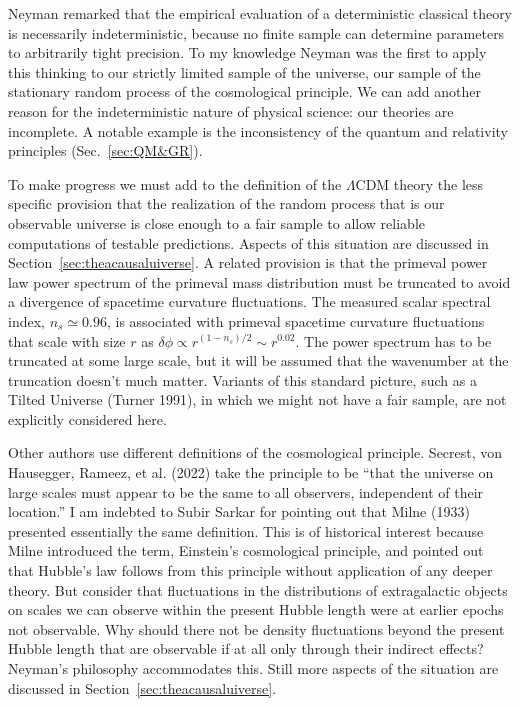 \documentclass[fleqn,12pt]{article}
\begin{document}
Neyman remarked that the empirical evaluation of a deterministic classical theory is necessarily indeterministic, because no finite sample can determine parameters to arbitrarily tight precision. To my knowledge Neyman was the first to apply this thinking to our strictly limited sample of the universe, our sample of the stationary random process of the cosmological principle. We can add another reason for the  indeterministic nature of physical science: our theories are incomplete. A notable example is the inconsistency of the quantum and relativity principles (Sec.~\ref{sec:QM&GR}).

To make progress we must add to the definition of the $\Lambda$CDM theory the less specific provision that the realization of the random process that is our observable universe is close enough to a fair sample to allow reliable computations of testable predictions. Aspects of this situation are discussed in Section~\ref{sec:theacausaluiverse}. A related provision is that the primeval power law power spectrum of the primeval mass distribution must be truncated to avoid a divergence of spacetime curvature fluctuations. The measured scalar spectral index, $n_s\simeq 0.96$, is associated with primeval spacetime curvature fluctuations that scale with size $r$ as $\delta\phi\propto r^{(1-n_s)/2}\sim r^{0.02}$. The power spectrum has to be truncated at some large scale, but it will be assumed that the wavenumber at the truncation doesn't much matter.  Variants of this standard picture, such as a Tilted Universe (Turner 1991), in which we might not have a fair sample, are not explicitly considered here. 

Other authors use different definitions of the cosmological principle.  Secrest, von Hausegger, Rameez, et al. (2022) take the principle to be ``that the universe on large scales must appear to be the same to all observers, independent of their location.'' I am indebted to Subir Sarkar for pointing out that Milne (1933) presented essentially the same definition. This is of historical interest because Milne introduced the term, Einstein's cosmological principle, and pointed out that Hubble's law follows from this principle without application of any deeper theory. But consider that fluctuations in the distributions of extragalactic objects on scales we can observe within the present Hubble length were at earlier epochs not observable. Why should there not be density fluctuations beyond the present Hubble length that are observable if at all only through their indirect effects? Neyman's philosophy accommodates this. Still more aspects of the situation are discussed in Section~\ref{sec:theacausaluiverse}.
\end{document}
